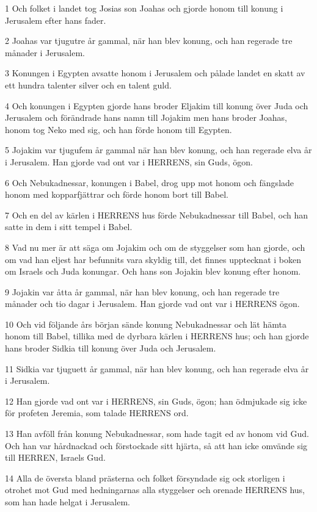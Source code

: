 \par 1 Och folket i landet tog Josias son Joahas och gjorde honom till konung i Jerusalem efter hans fader.
\par 2 Joahas var tjugutre år gammal, när han blev konung, och han regerade tre månader i Jerusalem.
\par 3 Konungen i Egypten avsatte honom i Jerusalem och pålade landet en skatt av ett hundra talenter silver och en talent guld.
\par 4 Och konungen i Egypten gjorde hans broder Eljakim till konung över Juda och Jerusalem och förändrade hans namn till Jojakim men hans broder Joahas, honom tog Neko med sig, och han förde honom till Egypten.
\par 5 Jojakim var tjugufem år gammal när han blev konung, och han regerade elva år i Jerusalem. Han gjorde vad ont var i HERRENS, sin Guds, ögon.
\par 6 Och Nebukadnessar, konungen i Babel, drog upp mot honom och fängslade honom med kopparfjättrar och förde honom bort till Babel.
\par 7 Och en del av kärlen i HERRENS hus förde Nebukadnessar till Babel, och han satte in dem i sitt tempel i Babel.
\par 8 Vad nu mer är att säga om Jojakim och om de styggelser som han gjorde, och om vad han eljest har befunnits vara skyldig till, det finnes upptecknat i boken om Israels och Juda konungar. Och hans son Jojakin blev konung efter honom.
\par 9 Jojakin var åtta år gammal, när han blev konung, och han regerade tre månader och tio dagar i Jerusalem. Han gjorde vad ont var i HERRENS ögon.
\par 10 Och vid följande års början sände konung Nebukadnessar och lät hämta honom till Babel, tillika med de dyrbara kärlen i HERRENS hus; och han gjorde hans broder Sidkia till konung över Juda och Jerusalem.
\par 11 Sidkia var tjuguett år gammal, när han blev konung, och han regerade elva år i Jerusalem.
\par 12 Han gjorde vad ont var i HERRENS, sin Guds, ögon; han ödmjukade sig icke för profeten Jeremia, som talade HERRENS ord.
\par 13 Han avföll från konung Nebukadnessar, som hade tagit ed av honom vid Gud. Och han var hårdnackad och förstockade sitt hjärta, så att han icke omvände sig till HERREN, Israels Gud.
\par 14 Alla de översta bland prästerna och folket försyndade sig ock storligen i otrohet mot Gud med hedningarnas alla styggelser och orenade HERRENS hus, som han hade helgat i Jerusalem.
